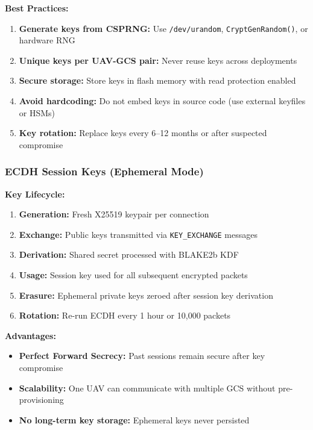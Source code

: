 \documentclass[11pt,a4paper]{article}
\begin{document}
\textbf{Best Practices:}
\begin{enumerate}[noitemsep]
    \item \textbf{Generate keys from CSPRNG:} Use \texttt{/dev/urandom}, \texttt{CryptGenRandom()}, or hardware RNG
    \item \textbf{Unique keys per UAV-GCS pair:} Never reuse keys across deployments
    \item \textbf{Secure storage:} Store keys in flash memory with read protection enabled
    \item \textbf{Avoid hardcoding:} Do not embed keys in source code (use external keyfiles or HSMs)
    \item \textbf{Key rotation:} Replace keys every 6--12 months or after suspected compromise
\end{enumerate}

\subsubsection{ECDH Session Keys (Ephemeral Mode)}

\textbf{Key Lifecycle:}
\begin{enumerate}[noitemsep]
    \item \textbf{Generation:} Fresh X25519 keypair per connection
    \item \textbf{Exchange:} Public keys transmitted via \texttt{KEY\_EXCHANGE} messages
    \item \textbf{Derivation:} Shared secret processed with BLAKE2b KDF
    \item \textbf{Usage:} Session key used for all subsequent encrypted packets
    \item \textbf{Erasure:} Ephemeral private keys zeroed after session key derivation
    \item \textbf{Rotation:} Re-run ECDH every 1 hour or 10,000 packets
\end{enumerate}

\textbf{Advantages:}
\begin{itemize}[noitemsep]
    \item \textbf{Perfect Forward Secrecy:} Past sessions remain secure after key compromise
    \item \textbf{Scalability:} One UAV can communicate with multiple GCS without pre-provisioning
    \item \textbf{No long-term key storage:} Ephemeral keys never persisted
\end{itemize}
\end{document}
